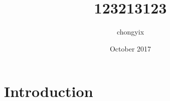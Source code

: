 \documentclass{article}
\title{123213123}
\author{chongyix }
\date{October 2017}
\begin{document}
\maketitle

\section{Introduction}
\end{document}

